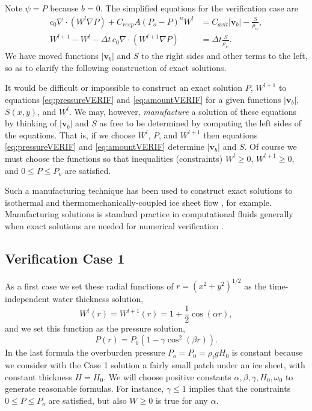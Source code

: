 \documentclass[11pt]{amsart}
\newcommand{\bv}{\mathbf{v}}
\newcommand{\Cavit}{C_{avit}}
\newcommand{\Creep}{C_{reep}}
\begin{document}
Note $\psi = P$ because $b=0$.  The simplified equations for the verification case are
\begin{align}
c_0 \nabla \cdot \left(W^l \nabla P\right) + \Creep A (P_o - P)^n W^l &= \Cavit |\bv_b| - \frac{S}{\rho_w}, \label{eq:pressureVERIF} \\
W^{l+1} - W^l - \Delta t\, c_0 \nabla \cdot \left(W^{l+1} \nabla P\right) &= \Delta t \frac{S}{\rho_w}. \label{eq:amountVERIF}
\end{align}
We have moved functions $|\bv_b|$ and $S$ to the right sides and other terms to the left, so as to clarify the following construction of exact solutions.

It would be difficult or impossible to construct an exact solution $P$, $W^{l+1}$ to equations \eqref{eq:pressureVERIF} and \eqref{eq:amountVERIF} for a given functions $|\bv_b|$, $S(x,y)$, and $W^l$.  We may, however, \emph{manufacture} a solution of these equations by thinking of $|\bv_b|$ and $S$ as free to be determined by computing the left sides of the equations.  That is, if we choose $W^l$, $P$, and $W^{l+1}$ then equations \eqref{eq:pressureVERIF} and \eqref{eq:amountVERIF} determine $|\bv_b|$ and $S$.  Of course we must choose the functions so that inequalities (constraints) $W^l\ge 0$, $W^{l+1}\ge 0$, and $0\le P \le P_o$ are satisfied.

Such a manufacturing technique has been used to construct exact solutions to isothermal and thermomechanically-coupled ice sheet flow \citep{BLKCB,BBL}, for example.  Manufacturing solutions is standard practice in computational fluids generally when exact solutions are needed for numerical verification \citep{Roache}.


\subsection*{Verification Case 1}  As a first case we set these radial functions of $r = (x^2+y^2)^{1/2}$ as the time-independent water thickness solution,
\begin{equation} \label{eq:manuWWone}
W^l(r) = W^{l+1}(r) = 1 + \frac{1}{2} \cos(\alpha r),
\end{equation}
and we set this function as the pressure solution,
\begin{equation} \label{eq:manuPone}
P(r) = P_0 \left(1 - \gamma \cos^2(\beta r)\right).
\end{equation}
In the last formula the overburden pressure $P_o = P_0 = \rho_i g H_0$ is constant because we consider with the Case 1 solution a fairly small patch under an ice sheet, with constant thickness $H=H_0$.  We will choose positive constants $\alpha, \beta, \gamma, H_0, \omega_0$ to generate reasonable formulas.  For instance, $\gamma \le 1$ implies that the constraints $0 \le P \le P_o$ are satisfied, but also $W\ge 0$ is true for any $\alpha$.
\end{document}
